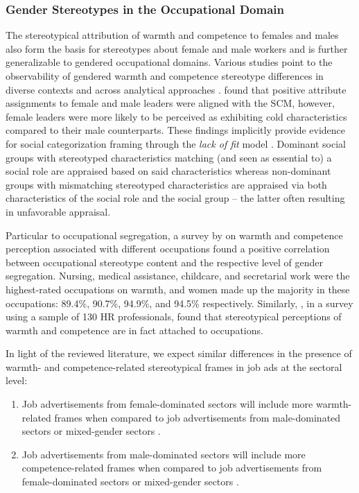 \documentclass[man]{apa7}
\begin{document}
\subsubsection{Gender Stereotypes in the Occupational Domain}
The stereotypical attribution of warmth and competence to females and males also form the basis for stereotypes about female and male workers \parencite{froehlich_gender_2020} and is further generalizable to gendered occupational domains. Various studies point to the observability of gendered warmth and competence stereotype differences in diverse contexts and across analytical approaches \parencite{aaldering_political_2020, harmer_are_2017}. \Textcite{smith_power_2019} found that positive attribute assignments to female and male leaders were aligned with the SCM, however, female leaders were more likely to be perceived as exhibiting cold characteristics compared to their male counterparts. These findings implicitly provide evidence for social categorization framing through the \textit{lack of fit} model \parencite[see][]{heilman_gender_2012, horvath_reducing_2016}. Dominant social groups with stereotyped characteristics matching (and seen as essential to) a social role are appraised based on said characteristics whereas non-dominant groups with mismatching stereotyped characteristics are appraised via both characteristics of the social role and the social group – the latter often resulting in unfavorable appraisal.

Particular to occupational segregation, a survey by \Textcite{he_stereotypes_2019} on warmth and competence perception associated with different occupations found a positive correlation between occupational stereotype content and the respective level of gender segregation. Nursing, medical assistance, childcare, and secretarial work were the highest-rated occupations on warmth, and women made up the majority in these occupations: 89.4\%, 90.7\%, 94.9\%, and 94.5\% respectively. Similarly, \Textcite{strinic_occupational_2021}, in a survey using a sample of 130 HR professionals, found that stereotypical perceptions of warmth and competence are in fact attached to occupations.

In light of the reviewed literature, we expect similar differences in the presence of warmth- and competence-related stereotypical frames in job ads at the sectoral level:

\begin{enumerate}[leftmargin=2.5cm, labelsep=0.25cm, align=left, label={\textbf{Hypothesis \arabic*:}}]

\item Job advertisements from female-dominated sectors will include more warmth-related frames when compared to job advertisements from male-dominated sectors  or mixed-gender sectors .

\item Job advertisements from male-dominated sectors will include more competence-related frames when compared to job advertisements from female-dominated sectors  or mixed-gender sectors .

\end{enumerate}
\end{document}
